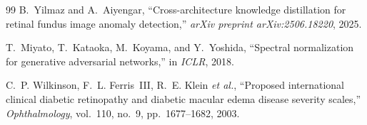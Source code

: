 \documentclass[10pt, twocolumn]{article}
\begin{document}
\begin{thebibliography}{99}
B.~Yilmaz and A.~Aiyengar, ``Cross-architecture knowledge distillation for retinal fundus image anomaly detection,'' \textit{arXiv preprint arXiv:2506.18220}, 2025.

T.~Miyato, T.~Kataoka, M.~Koyama, and Y.~Yoshida, ``Spectral normalization for generative adversarial networks,'' in \textit{ICLR}, 2018.

C.~P. Wilkinson, F.~L. Ferris~III, R.~E. Klein \textit{et al.}, ``Proposed international clinical diabetic retinopathy and diabetic macular edema disease severity scales,'' \textit{Ophthalmology}, vol.~110, no.~9, pp.~1677--1682, 2003.

\end{thebibliography}
\end{document}
